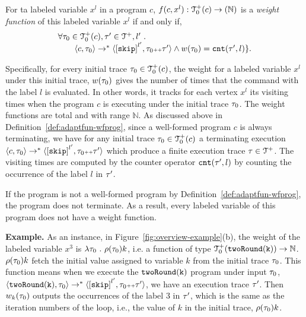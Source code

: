 \begin{defn}
 \label{def:lvar_weight} For ta labeled variable $x^l$ in a program $c$,
$f({c}, x^l): \mathcal{T}^{+}_0(c) \to (\mathbb{N})$ is a \emph{weight function} of this labeled
variable $x^l$ if and only if,
\[
 \begin{array}{l}
 \forall \trace_0 \in \ftdom_0(c), \trace' \in \ftdom, l' \st 
 \\ \qquad 
 \config{{c}, \trace_0} \to^{*} 
 \config{\clabel{\eskip}^{l'}, \trace_0 \tracecat \trace'} 
 \land w(\trace_0) = \vcounter(\trace', l) \}. 
 \end{array}
 \]
\end{defn}
Specifically, for every initial trace $\mathtt{\tau}_0 \in \mathcal{T}^{+}_0(c)$,
the weight for a labeled variable $x^l$ under this initial trace, $w(\mathtt{\tau}_0)$
gives the number of times that the command with the label $l$ is evaluated.
In other words, it tracks for each vertex $x^l$ its visiting times 
 when the program $c$ is executing under the initial trace $\mathtt{\tau}_0$.
 The weight functions are total and with range $\mathbb{N}$. 
 As discussed above in Definition~\ref{def:adaptfun-wfprog}, since a well-formed program $c$ is always terminating, we have
 for any initial trace $\mathtt{\tau}_0 \in \mathcal{T}^{+}_0(c)$ a terminating execution 
 $\config{{c}, \trace_0} \to^{*} \config{\clabel{\eskip}^{l'}, \trace_0\tracecat\trace'} $
 which produce a finite execution trace $\mathtt{\tau} \in \mathcal{T}^{+}$.
The visiting times are computed by the counter operator $\mathtt{cnt}(\mathtt{\tau}', l)$
by counting the occurrence of the label $l$ in $\mathtt{\tau}'$.

If the program is not a well-formed program by Definition~\ref{def:adaptfun-wfprog}, the program does not terminate.
As a result, every labeled variable of this program does not have a weight function.

\textbf{Example.} 
As an instance, in Figure~\ref{fig:overview-example}(b), the weight of the labeled variable $x^3$ is 
$\lambda \mathtt{\tau}_0 ~.~ \rho(\mathtt{\tau}_0) k$, i.e.
a function of type $\mathcal{T}^{+}_0(\mathtt{twoRound(k)}) \to \mathbb{N}$.
$\rho(\mathtt{\tau}_0) k$ fetch the initial value assigned to variable $k$ from the initial trace $\mathtt{\tau}_0$.
This function means when 
we execute the $\mathtt{twoRound(k)}$ program under input $\mathtt{\tau}_0$, 
$\config{\kw{twoRound(k)}, \trace_0} \to^{*} \config{\clabel{\eskip}^{l'}, \trace_0\tracecat\trace'} $,
we have an execution trace $\mathtt{\tau}'$.
Then $w_k(\mathtt{\tau}_0)$ outputs the occurrences of the label $3$ in $\mathtt{\tau}'$, which is 
the same as the iteration numbers of the loop,
i.e., the value of $k$ in the initial trace, $\rho(\mathtt{\tau}_0) k$.


